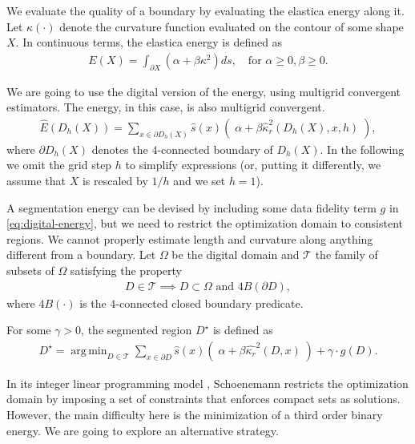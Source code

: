 \documentclass[runningheads]{llncs}
\DeclareMathOperator*{\argmin}{arg\,min}
\begin{document}
We evaluate the quality of a boundary by evaluating the elastica energy along it. Let $\kappa (\cdot)$ denote the curvature function evaluated on the contour of some shape $X$. In continuous terms, the elastica energy is defined as 
\begin{align*}
  E(X) = \int_{\partial X}{(\alpha + \beta \kappa^2) ds}, \quad \text{for~} \alpha \ge 0, \beta \ge 0.
\end{align*}

We are going to use the digital version of the energy, using multigrid convergent estimators. The energy, in this case, is also multigrid convergent.
\begin{align}
	\hat{E}( D_h(X) ) = \sum_{x \in \partial D_h(X)}{ \hat{s}(x)\left(\; \alpha + \beta \hat{\kappa}_{r}^2(D_h(X),x,h) \; \right)}, 
	\label{eq:digital-energy}
\end{align}
where $\partial D_h(X)$ denotes the $4$-connected boundary of $D_h(X)$. In the following we omit the grid step $h$ to simplify expressions (or, putting it differently, we assume that $X$ is rescaled by $1/h$ and we set $h=1$).

A segmentation energy can be devised by including some data fidelity term $g$ in \eqref{eq:digital-energy}, but we need to restrict the optimization domain to consistent regions. We cannot properly estimate length and curvature along anything different from a boundary. Let $\Omega$ be the digital domain and $\mathcal{T}$ the family of subsets of $\Omega$ satisfying the property
\begin{align*}
	D \in \mathcal{T} \implies D \subset \Omega \text{ and } 4B(\partial D),
\end{align*} 
where $4B(\cdot)$ is the $4$-connected closed boundary predicate. 


For some $\gamma>0$, the segmented region $D^\star$ is defined as
\begin{align}
	D^{\star} = \argmin_{D \in \mathcal{T}}{\sum_{x \in \partial D}{ \hat{s}(x)\left(\; \alpha + \beta \hat{\kappa_{r}}^2(D,x) \; \right)} + \gamma \cdot g(D).}
	\label{eq:ideal_optimization_energy}
\end{align}

In its integer linear programming model \cite{schoenemann09}, Schoenemann restricts the optimization domain by imposing a set of constraints that enforces compact sets as solutions. However, the main difficulty here is the minimization of a third order binary energy. We are going to explore an alternative strategy.
\end{document}
